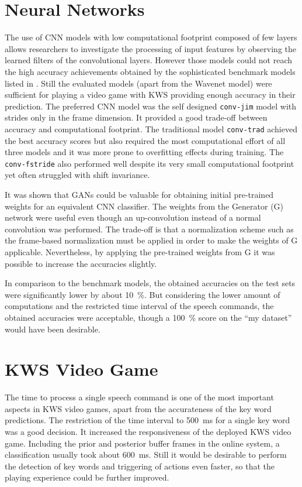 \section{Neural Networks}
The use of CNN models with low computational footprint composed of few layers allows researchers to investigate the processing of input features by observing the learned filters of the convolutional layers.
However those models could not reach the high accuracy achievements obtained by the sophisticated benchmark models listed in .
Still the evaluated models (apart from the Wavenet model) were sufficient for playing a video game with KWS providing enough accuracy in their prediction.
The preferred CNN model was the self designed \texttt{conv-jim} model with strides only in the frame dimension.
It provided a good trade-off between accuracy and computational footprint.
The traditional model \texttt{conv-trad} achieved the best accuracy scores but also required the most computational effort of all three models and it was more prone to overfitting effects during training.
The \texttt{conv-fstride} also performed well despite its very small computational footprint yet often struggled with shift invariance.

It was shown that GANs could be valuable for obtaining initial pre-trained weights for an equivalent CNN classifier.
The weights from the Generator (G) network were useful even though an up-convolution instead of a normal convolution was performed.
The trade-off is that a normalization scheme such as the frame-based normalization must be applied in order to make the weights of G applicable.
Nevertheless, by applying the pre-trained weights from G it was possible to increase the accuracies slightly.

In comparison to the benchmark models, the obtained accuracies on the test sets were significantly lower by about \SI{10}{\percent}.
But considering the lower amount of computations and the restricted time interval of the speech commands, the obtained accuracies were acceptable, though a \SI{100}{\percent} score on the \enquote{my dataset} would have been desirable.



\section{KWS Video Game}
The time to process a single speech command is one of the most important aspects in KWS video games, apart from the accurateness of the key word predictions.
The restriction of the time interval to \SI{500}{\milli\second} for a single key word was a good decision.
It increased the responsiveness of the deployed KWS video game.
Including the prior and posterior buffer frames in the online system, a classification usually took about \SI{600}{\milli\second}.
Still it would be desirable to perform the detection of key words and triggering of actions even faster, so that the playing experience could be further improved.

